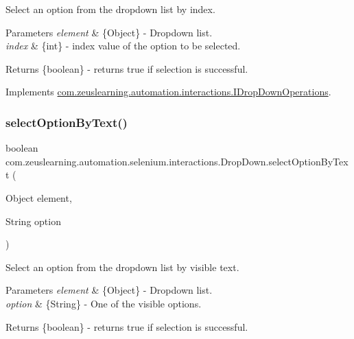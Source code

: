 Select an option from the dropdown list by index.


\begin{DoxyParams}{Parameters}
{\em element} & \{Object\} -\/ Dropdown list. \\
\hline
{\em index} & \{int\} -\/ index value of the option to be selected.\\
\hline
\end{DoxyParams}
\begin{DoxyReturn}{Returns}
\{boolean\} -\/ returns {\ttfamily true} if selection is successful. 
\end{DoxyReturn}


Implements \hyperlink{interfacecom_1_1zeuslearning_1_1automation_1_1interactions_1_1IDropDownOperations_ad895dc1fcaa582ece4c02e9102dd73c8}{com.\+zeuslearning.\+automation.\+interactions.\+I\+Drop\+Down\+Operations}.

\hypertarget{classcom_1_1zeuslearning_1_1automation_1_1selenium_1_1interactions_1_1DropDown_aa7c95fbe76e90d922c20459d6917e57e}{}\label{classcom_1_1zeuslearning_1_1automation_1_1selenium_1_1interactions_1_1DropDown_aa7c95fbe76e90d922c20459d6917e57e} 
\subsubsection{\texorpdfstring{select\+Option\+By\+Text()}{selectOptionByText()}}
{\footnotesize\ttfamily boolean com.\+zeuslearning.\+automation.\+selenium.\+interactions.\+Drop\+Down.\+select\+Option\+By\+Text (\begin{DoxyParamCaption}\item[{Object}]{element,  }\item[{String}]{option }\end{DoxyParamCaption})\hspace{0.3cm}{\ttfamily [inline]}}

Select an option from the dropdown list by visible text.


\begin{DoxyParams}{Parameters}
{\em element} & \{Object\} -\/ Dropdown list. \\
\hline
{\em option} & \{String\} -\/ One of the visible options.\\
\hline
\end{DoxyParams}
\begin{DoxyReturn}{Returns}
\{boolean\} -\/ returns {\ttfamily true} if selection is successful. 
\end{DoxyReturn}


